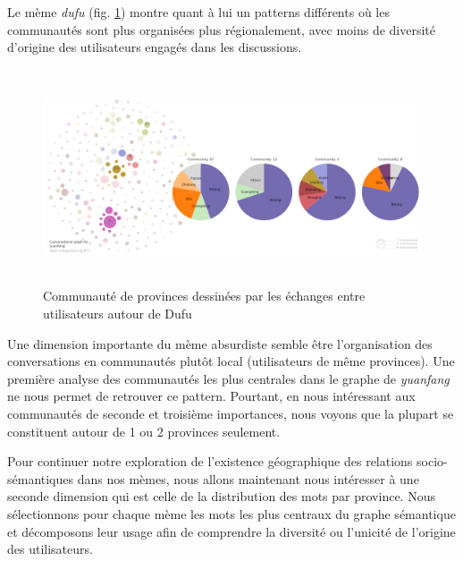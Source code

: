 Le m\`eme \textit{dufu} (fig. \ref{fig:dufu-users-pie}) montre quant \`a lui un patterns diff\'erents
o\`u les communaut\'es sont plus organis\'ees plus r\'egionalement,
avec moins de diversit\'e d{\textquoteright}origine des utilisateurs
engag\'es dans les discussions.


\begin{figure}
    \centering
    \includegraphics[width=5.9996in,height=2.5004in]{figures/chap4/chapitre4-img58.png}
    \caption{
        Communaut\'e de provinces dessin\'ees par les \'echanges entre utilisateurs autour de Dufu
    }
    \label{fig:dufu-users-pie}
\end{figure}



Une dimension importante du m\`eme absurdiste semble \^etre
l{\textquoteright}organisation des conversations en communaut\'es
plut\^ot local (utilisateurs de m\^eme provinces). Une premi\`ere
analyse des communaut\'es les plus centrales dans le graphe de
\textit{yuanfang} ne nous permet de retrouver ce pattern. Pourtant, en
nous int\'eressant aux communaut\'es de seconde et troisi\`eme
importances, nous voyons que la plupart se constituent autour de 1 ou 2
provinces seulement. 


Pour continuer notre exploration de l{\textquoteright}existence
g\'eographique des relations socio-s\'emantiques dans nos m\`emes, nous
allons maintenant nous int\'eresser \`a une seconde dimension qui est
celle de la distribution des mots par province. Nous s\'electionnons
pour chaque m\`eme les mots les plus centraux du graphe s\'emantique et
d\'ecomposons leur usage afin de comprendre la diversit\'e ou
l{\textquoteright}unicit\'e de l{\textquoteright}origine des
utilisateurs.


